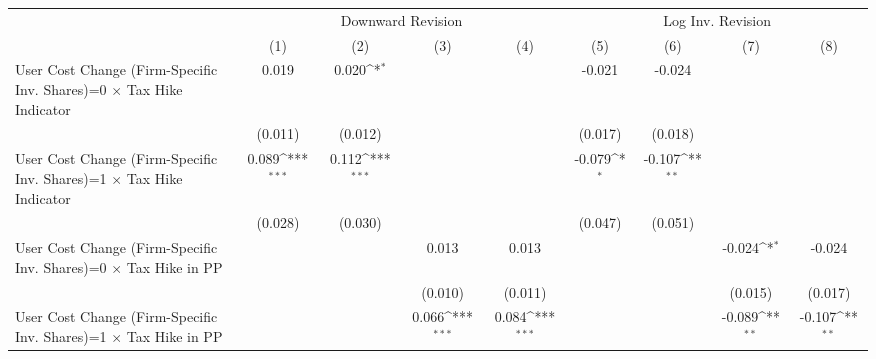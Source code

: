 {
\def\sym#1{\ifmmode^{#1}\else\(^{#1}\)\fi}
\begin{tabular}{l*{8}{c}}
\toprule
                    &\multicolumn{4}{c}{Downward Revision}                                                  &\multicolumn{4}{c}{Log Inv. Revision}                                                  \\\cmidrule(lr){2-5}\cmidrule(lr){6-9}
                    &\multicolumn{1}{c}{(1)}         &\multicolumn{1}{c}{(2)}         &\multicolumn{1}{c}{(3)}         &\multicolumn{1}{c}{(4)}         &\multicolumn{1}{c}{(5)}         &\multicolumn{1}{c}{(6)}         &\multicolumn{1}{c}{(7)}         &\multicolumn{1}{c}{(8)}         \\
\midrule
User Cost Change (Firm-Specific Inv. Shares)=0 $\times$ Tax Hike Indicator&       0.019         &       0.020\sym{*}  &                     &                     &      -0.021         &      -0.024         &                     &                     \\
                    &     (0.011)         &     (0.012)         &                     &                     &     (0.017)         &     (0.018)         &                     &                     \\
User Cost Change (Firm-Specific Inv. Shares)=1 $\times$ Tax Hike Indicator&       0.089\sym{***}&       0.112\sym{***}&                     &                     &      -0.079\sym{*}  &      -0.107\sym{**} &                     &                     \\
                    &     (0.028)         &     (0.030)         &                     &                     &     (0.047)         &     (0.051)         &                     &                     \\
User Cost Change (Firm-Specific Inv. Shares)=0 $\times$ Tax Hike in PP&                     &                     &       0.013         &       0.013         &                     &                     &      -0.024\sym{*}  &      -0.024         \\
                    &                     &                     &     (0.010)         &     (0.011)         &                     &                     &     (0.015)         &     (0.017)         \\
User Cost Change (Firm-Specific Inv. Shares)=1 $\times$ Tax Hike in PP&                     &                     &       0.066\sym{***}&       0.084\sym{***}&                     &                     &      -0.089\sym{**} &      -0.107\sym{**} \\

\end{tabular}}
